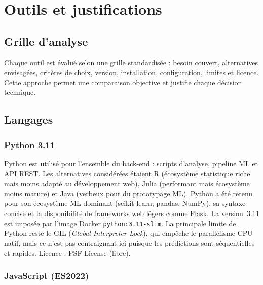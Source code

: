 \documentclass[12pt,a4paper,openany]{report}
\begin{document}
\chapter{Outils et justifications}


\section{Grille d'analyse}

Chaque outil est évalué selon une grille standardisée : besoin couvert, alternatives
envisagées, critères de choix, version, installation, configuration, limites et licence.
Cette approche permet une comparaison objective et justifie chaque décision technique.

\section{Langages}

\subsection{Python 3.11}
Python est utilisé pour l'ensemble du back-end : scripts d'analyse, pipeline ML et API REST. Les alternatives considérées étaient R (écosystème statistique riche mais moins adapté au développement web), Julia (performant mais écosystème moins mature) et Java (verbeux pour du prototypage ML). Python a été retenu pour son écosystème ML dominant (scikit-learn, pandas, NumPy), sa syntaxe concise et la disponibilité de frameworks web légers comme Flask. La version~3.11 est imposée par l'image Docker \texttt{python:3.11-slim}. La principale limite de Python reste le GIL (\emph{Global Interpreter Lock}), qui empêche le parallélisme CPU natif, mais ce n'est pas contraignant ici puisque les prédictions sont séquentielles et rapides. Licence : PSF License (libre).

\subsection{JavaScript (ES2022)}
\end{document}
